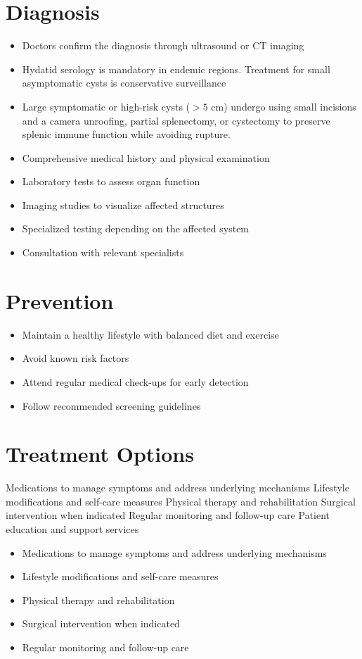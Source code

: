 \section{Diagnosis}
\begin{itemize}[noitemsep]
  \item Doctors confirm the diagnosis through ultrasound or CT imaging
  \item Hydatid serology is mandatory in endemic regions. Treatment for small asymptomatic cysts is conservative surveillance
  \item Large symptomatic or high-risk cysts ($>5$ cm) undergo using small incisions and a camera unroofing, partial splenectomy, or cystectomy to preserve splenic immune function while avoiding rupture.
  \item Comprehensive medical history and physical examination
  \item Laboratory tests to assess organ function
  \item Imaging studies to visualize affected structures
  \item Specialized testing depending on the affected system
  \item Consultation with relevant specialists
\end{itemize}
\section{Prevention}
\begin{itemize}[noitemsep]
  \item Maintain a healthy lifestyle with balanced diet and exercise
  \item Avoid known risk factors
  \item Attend regular medical check-ups for early detection
  \item Follow recommended screening guidelines
\end{itemize}
\section{Treatment Options}
Medications to manage symptoms and address underlying mechanisms Lifestyle modifications and self-care measures Physical therapy and rehabilitation Surgical intervention when indicated Regular monitoring and follow-up care Patient education and support services

\begin{itemize}[noitemsep]
  \item Medications to manage symptoms and address underlying mechanisms
  \item Lifestyle modifications and self-care measures
  \item Physical therapy and rehabilitation
  \item Surgical intervention when indicated
  \item Regular monitoring and follow-up care
\end{itemize}
